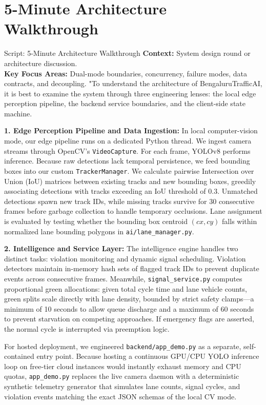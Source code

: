 \section{5-Minute Architecture Walkthrough}
\label{sec:script_5min}

\begin{interviewq}{Script: 5-Minute Architecture Walkthrough}
\textbf{Context:} System design round or architecture discussion.\\
\textbf{Key Focus Areas:} Dual-mode boundaries, concurrency, failure modes, data contracts, and decoupling.
\tcblower
"To understand the architecture of BengaluruTrafficAI, it is best to examine the system through three engineering lenses: the local edge perception pipeline, the backend service boundaries, and the client-side state machine.

\textbf{1. Edge Perception Pipeline and Data Ingestion:}
In local computer-vision mode, our edge pipeline runs on a dedicated Python thread. We ingest camera streams through OpenCV's \texttt{VideoCapture}. For each frame, YOLOv8 performs inference. Because raw detections lack temporal persistence, we feed bounding boxes into our custom \texttt{TrackerManager}. We calculate pairwise Intersection over Union (IoU) matrices between existing tracks and new bounding boxes, greedily associating detections with tracks exceeding an IoU threshold of 0.3. Unmatched detections spawn new track IDs, while missing tracks survive for 30 consecutive frames before garbage collection to handle temporary occlusions. Lane assignment is evaluated by testing whether the bounding box centroid $(cx, cy)$ falls within normalized lane bounding polygons in \texttt{ai/lane\_manager.py}.

\textbf{2. Intelligence and Service Layer:}
The intelligence engine handles two distinct tasks: violation monitoring and dynamic signal scheduling. Violation detectors maintain in-memory hash sets of flagged track IDs to prevent duplicate events across consecutive frames. Meanwhile, \texttt{signal\_service.py} computes proportional green allocations: given total cycle time and lane vehicle counts, green splits scale directly with lane density, bounded by strict safety clamps---a minimum of 10 seconds to allow queue discharge and a maximum of 60 seconds to prevent starvation on competing approaches. If emergency flags are asserted, the normal cycle is interrupted via preemption logic.

For hosted deployment, we engineered \texttt{backend/app\_demo.py} as a separate, self-contained entry point. Because hosting a continuous GPU/CPU YOLO inference loop on free-tier cloud instances would instantly exhaust memory and CPU quotas, \texttt{app\_demo.py} replaces the live camera daemon with a deterministic synthetic telemetry generator that simulates lane counts, signal cycles, and violation events matching the exact JSON schemas of the local CV mode.


\end{interviewq}
